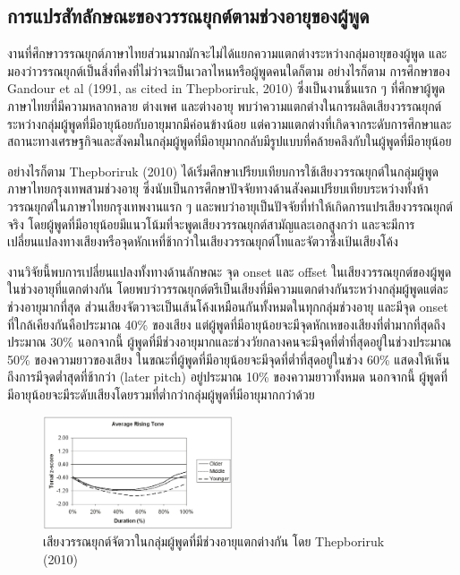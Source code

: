 \documentclass[a4paper]{article}
\begin{document}
\subsection{การแปรสัทลักษณะของวรรณยุกต์ตามช่วงอายุของผู้พูด}
    งานที่ศึกษาวรรณยุกต์ภาษาไทยส่วนมากมักจะไม่ได้แยกความแตกต่างระหว่างกลุ่มอายุของผู้พูด และมองว่าวรรณยุกต์เป็นสิ่งที่คงที่ไม่ว่าจะเป็นเวลาไหนหรือผู้พูดคนใดก็ตาม อย่างไรก็ตาม การศึกษาของ Gandour et al (1991, as cited in Thepboriruk, 2010) ซึ่งเป็นงานชิ้นแรก ๆ ที่ศึกษาผู้พูดภาษาไทยที่มีความหลากหลาย ต่างเพศ และต่างอายุ พบว่าความแตกต่างในการผลิตเสียงวรรณยุกต์ระหว่างกลุ่มผู้พูดที่มีอายุน้อยกับอายุมากมีค่อนข้างน้อย แต่ความแตกต่างที่เกิดจากระดับการศึกษาและสถานะทางเศรษฐกิจและสังคมในกลุ่มผู้พูดที่มีอายุมากกลับมีรูปแบบที่คล้ายคลึงกับในผู้พูดที่มีอายุน้อย

    อย่างไรก็ตาม Thepboriruk (2010) ได้เริ่มศึกษาเปรียบเทียบการใช้เสียงวรรณยุกต์ในกลุ่มผู้พูดภาษาไทยกรุงเทพสามช่วงอายุ ซึ่งนับเป็นการศึกษาปัจจัยทางด้านสังคมเปรียบเทียบระหว่างทั้งห้าวรรณยุกต์ในภาษาไทยกรุงเทพงานแรก ๆ และพบว่าอายุเป็นปัจจัยที่ทำให้เกิดการแปรเสียงวรรณยุกต์จริง โดยผู้พูดที่มีอายุน้อยมีแนวโน้มที่จะพูดเสียงวรรณยุกต์สามัญและเอกสูงกว่า และจะมีการเปลี่ยนแปลงทางเสียงหรือจุดหักเหที่ช้ากว่าในเสียงวรรณยุกต์โทและจัตวาซึ่งเป้นเสียงโค้ง

    งานวิจัยนี้พบการเปลี่ยนแปลงทั้งทางด้านลักษณะ จุด onset และ offset ในเสียงวรรณยุกต์ของผู้พูดในช่วงอายุที่แตกต่างกัน โดยพบว่าวรรณยุกต์ตรีเป็นเสียงที่มีความแตกต่างกันระหว่างกลุ่มผู้พูดแต่ละช่วงอายุมากที่สุด ส่วนเสียงจัตวาจะเป็นเส้นโค้งเหมือนกันทั้งหมดในทุกกลุ่มช่วงอายุ และมีจุด onset ที่ใกล้เคียงกันคือประมาณ 40\% ของเสียง แต่ผู้พูดที่มีอายุน้อยจะมีจุดหักเหของเสียงที่ต่ำมากที่สุดถึงประมาณ 30\% นอกจากนี้ ผู้พูดที่มีช่วงอายุมากและช่วงวัยกลางคนจะมีจุดที่ต่ำที่สุดอยู่ในช่วงประมาณ 50\% ของความยาวของเสียง ในขณะที่ผู้พูดที่มีอายุน้อยจะมีจุดที่ต่ำที่สุดอยู่ในช่วง 60\% แสดงให้เห็นถึงการมีจุดต่ำสุดที่ช้ากว่า (later pitch) อยู่ประมาณ 10\% ของความยาวทั้งหมด นอกจากนี้ ผู้พูดที่มีอายุน้อยจะมีระดับเสียงโดยรวมที่ต่ำกว่ากลุ่มผู้พูดที่มีอายุมากกว่าด้วย
    \begin{figure}[!ht]
        \begin{center}
        \includegraphics[width=0.5\textwidth]{thepboriruk}
        \end{center}
        \caption{เสียงวรรณยุกต์จัตวาในกลุ่มผู้พูดที่มีช่วงอายุแตกต่างกัน โดย Thepboriruk (2010)}
    \end{figure}
\end{document}
